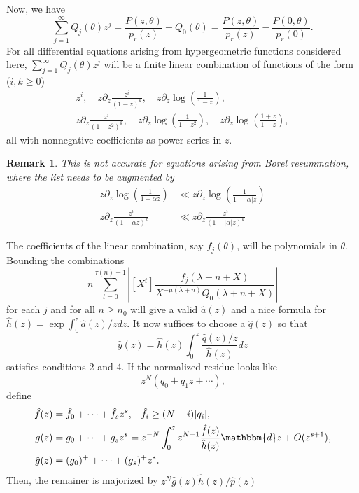 \documentclass[12pt]{article}
\newcommand{\dd}[0] {\mathbbm{d}}
\numberwithin{equation}{section}
\newtheorem{remark}[theorem]{Remark}
\begin{document}
Now, we have
\begin{equation*}
\sum_{j=1}^{\infty} Q_j(\theta) z^j = \frac{P(z,\theta)}{p_r(z)} - Q_0(\theta)
= \frac{P(z,\theta)}{p_r(z)} - \frac{P(0,\theta)}{p_r(0)} \text{.}
\end{equation*}
For all differential equations arising from hypergeometric functions considered here, $\sum_{j=1}^{\infty} Q_j(\theta) z^j$ will be a finite linear combination of functions of the form ($i, k \ge 0$)
\begin{gather*}
z^i, \quad z \partial_z \frac{z^i}{(1-z)^k}, \quad
z \partial_z \log \left( \frac{1}{1-z} \right),\\
z \partial_z \frac{z^i}{(1-z^2)^k}, \quad
z \partial_z \log \left( \frac{1}{1-z^2} \right), \quad
z \partial_z \log \left( \frac{1+z}{1-z} \right),
\end{gather*}
all with nonnegative coefficients as power series in $z$.

\begin{remark}
This is not accurate for equations arising from Borel resummation, where the list needs to be augmented by
\begin{align*}
z \partial_z \log\left(\frac{1}{1-\alpha z}\right) &\ll z \partial_z \log\left(\frac{1}{1-|\alpha| z}\right)\\
z \partial_z \frac{z^i}{(1-\alpha z)^k} &\ll z \partial_z\frac{z^i}{(1-|\alpha| z)^k}
\end{align*}
\end{remark}

The coefficients of the linear combination, say $f_j(\theta)$, will be polynomials in $\theta$. Bounding the combinations
\begin{equation*}
n \sum_{t=0}^{\tau(n) - 1} \left| [X^t] \frac{f_j(\lambda+n+X)}{X^{-\mu(\lambda+n)} Q_0(\lambda+n+X)} \right|
\end{equation*}
for each $j$ and for all $n \ge n_0$ will give a valid $\hat{a}(z)$ and a nice formula for $\hat{h}(z) = \exp \int_0^z \hat{a}(z)/z dz$. It now suffices to choose a $\hat{q}(z)$ so that
\begin{equation*}
\hat{y}(z)=\hat{h}(z) \int_0^z \frac{\hat{q}(z)/z}{\hat{h}(z)}{dz}
\end{equation*}
satisfies conditions 2 and 4. If the normalized residue looks like
\begin{equation*}
z^N (q_0 + q_1 z + \cdots)\text{,}
\end{equation*}
define
\begin{align*}
\hat{f}(z) &= \hat{f}_0 + \cdots + \hat{f}_s z^s\text{,} \quad \hat{f}_i \ge (N+i)|q_i|\text{,}\\
g(z) &= g_0 + \cdots + g_s z^s = z^{-N} \int_0^z z^{N-1} \frac{\hat{f}(z)}{\hat{h}(z)} \dd z + O(z^{s+1})\text{,}\\
\hat{g}(z) &= (g_0)^+ + \cdots + (g_s)^+ z^s\text{.}
\end{align*}
Then, the remainer is majorized by $z^N \hat{g}(z) \hat{h}(z)/ \hat{p}(z)$
\end{document}
